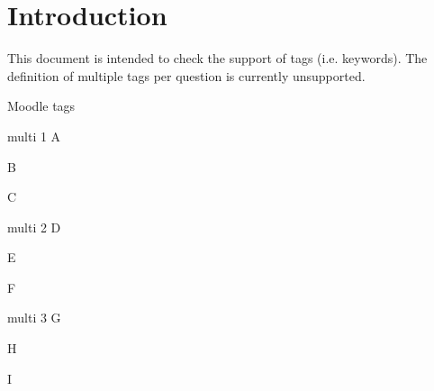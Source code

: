 \documentclass{article}
\begin{document}
\section*{Introduction}

This document is intended to check the support of tags (i.e. keywords). The 
definition of multiple tags per question is currently unsupported.

\begin{quiz}[points=1]{Moodle tags}

\begin{multi}[tags={multi}]{multi 1}
A
\item B
\item* C
\end{multi}

\begin{multi}[tags={}]{multi 2}
D
\item E
\item* F
\end{multi}

\begin{multi}[tags={éçö}]{multi 3}
G
\item H
\item* I
\end{multi}

\end{quiz}
\end{document}
